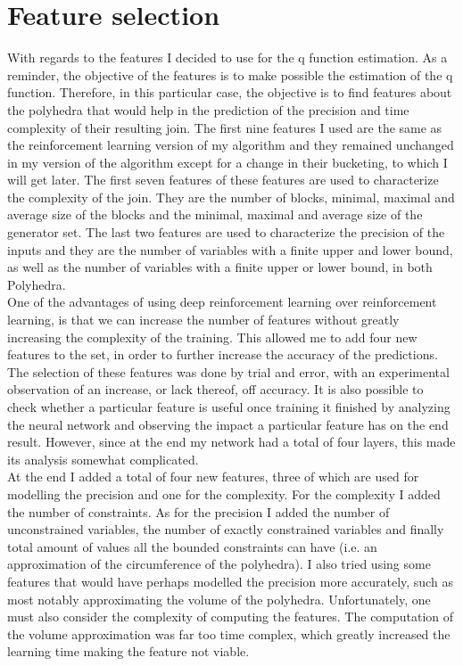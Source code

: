 \section{Feature selection}
With regards to the features I decided to use for the q function estimation. As a reminder, the objective of the features is to make possible the estimation of the q function. Therefore, in this particular case, the objective is to find features about the polyhedra that would help in the prediction of the precision and time complexity of their resulting join. The first nine features I used are the same as the reinforcement learning version of my algorithm and they remained unchanged in my version of the algorithm except for a change in their bucketing, to which I will get later. The first seven features of these features are used to characterize the complexity of the join. They are the number of blocks, minimal, maximal and average size of the blocks and the minimal, maximal and average size of the generator set. The last two features are used to characterize the precision of the inputs and they are the number of variables with a finite upper and lower bound, as well as the number of variables with a finite upper or lower bound, in both Polyhedra.\\
One of the advantages of using deep reinforcement learning over reinforcement learning, is that we can increase the number of features without greatly increasing the complexity of the training. This allowed me to add four new features to the set, in order to further increase the accuracy of the predictions. The selection of these features was done by trial and error, with an experimental observation of an increase, or lack thereof, off accuracy. It is also possible to check whether a particular feature is useful once training it finished by analyzing the neural network and observing the impact a particular feature has on the end result. However, since at the end my network had a total of four layers, this made its analysis somewhat complicated.\\
At the end I added a total of four new features, three of which are used for modelling the precision and one for the complexity. For the complexity I added the number of constraints. As for the precision I added the number of unconstrained variables, the number of exactly constrained variables and finally total amount of values all the bounded constraints can have (i.e. an approximation of the circumference of the polyhedra). I also tried using some features that would have perhaps modelled the precision more accurately, such as most notably approximating the volume of the polyhedra. Unfortunately, one must also consider the complexity of computing the features. The computation of the volume approximation was far too time complex, which greatly increased the learning time making the feature not viable.\\

